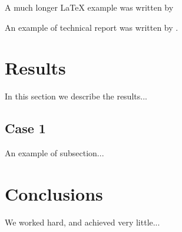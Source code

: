 \documentclass[10pt]{article}
\begin{document}
A much longer \LaTeX{} example was written by \citet{maculan2003integer}

An example of technical report was written by \citet{HoracioYanasse}.


\section{Results}\label{sec:3}
In this section we describe the results...

\subsection{Case 1}
An example of subsection...

\section{Conclusions}\label{sec:4}
We worked hard, and achieved very little...

\newpage

\end{document}
